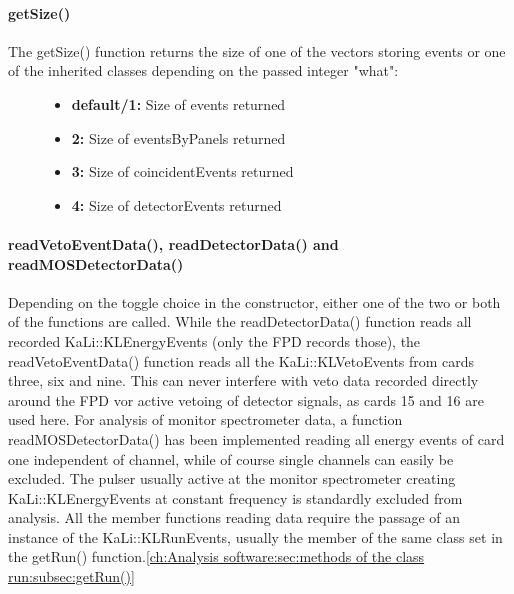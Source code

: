     
    
    \paragraph{getSize()}
    \label{ch:Analysis software:sec:methods of the class run:subsec:getSize()}
    The getSize() function returns the size of one of the vectors storing events or one of the inherited classes depending on the passed integer "what":
    \begin{figure}
    	\begin{itemize}
		
    		\item {\bf default/1:} Size of events returned
    		\item {\bf 2:} Size of eventsByPanels returned
    		\item {\bf 3:} Size of coincidentEvents returned
    		\item {\bf 4:} Size of detectorEvents returned
    	\end{itemize}

    \end{figure}

    
    \paragraph{readVetoEventData(), readDetectorData() and readMOSDetectorData()}
    \label{ch:Analysis software:sec:methods of the class run:subsec:readVetoEventData(), readDetectorData() and readMOSDetectorData()}
    Depending on the toggle choice in the constructor, either one of the two or both of the functions are called. While the readDetectorData() function reads all recorded KaLi::\-KLEnergy\-Events (only the FPD records those), the readVetoEventData() function reads all the KaLi::KLVetoEvents from cards three, six and nine. This can never interfere with veto data recorded directly around the FPD vor active vetoing of detector signals, as cards 15 and 16 are used here.
    For analysis of monitor spectrometer data, a function readMOSDetectorData() has been implemented reading all energy events of card one independent of channel, while of course single channels can easily be excluded. The pulser usually active at the monitor spectrometer creating KaLi::KLEnergyEvents at constant frequency is standardly excluded from analysis.
    All the member functions reading data require the passage of an instance of the KaLi::KLRunEvents, usually the member of the same class set in the getRun() function.\ref{ch:Analysis software:sec:methods of the class run:subsec:getRun()}

    
    
    
    
    
      